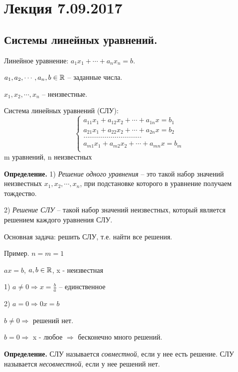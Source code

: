 \section{Лекция 7.09.2017}
\subsection{Системы линейных уравнений.}

Линейное уравнение: $a_1 x_1 + \cdots + a_n x_n = b$.

$a_1, a_2, \cdots, a_n, b \in \mathbb{R}$ -- заданные числа.

$x_1, x_2, \cdots, x_n$ -- неизвестные.

\bigskip
Система линейных уравнений (СЛУ):
\begin{equation*}
	\left\{
		\begin{aligned}
        a_{11}x_1 + a_{12}x_2 + \cdots + a_{1n}x = b_1 \\
        a_{21}x_1 + a_{22}x_2 + \cdots + a_{2n}x = b_2 \\
        \hdots \hdots \hdots \hdots \hdots \hdots \hdots \hdots \hdots \hdots\\
        a_{m1}x_1 + a_{m2}x_2 + \cdots + a_{mn}x = b_m \\
		\end{aligned}
	\right.
\end{equation*}
m уравнений, n неизвестных

\bigskip
\textbf{Определение.} 1) \textit{Решение одного уравнения} -- это такой набор значений неизвестных $x_1, x_2, \cdots, x_n$, при подстановке которого в уравнение получаем тождество.

2) \textit{Решение СЛУ} -- такой набор значений неизвестных, который является решением каждого уравнения СЛУ.

\bigskip
Основная задача: решить СЛУ, т.е. найти все решения.

\bigskip
Пример. $n = m = 1$

$ax = b$, $a, b \in \mathbb{R}$, x - неизвестная

1) $a \neq 0 \Rightarrow x = \frac{b}{a}$ -- единственное

2) $a = 0 \Rightarrow 0x = b$

$b \neq 0 \Rightarrow$ решений нет.

$b = 0 \Rightarrow$ x - любое $\Rightarrow$ бесконечно много решений.

\bigskip
\textbf{Определение.} СЛУ называется \textit{совместной}, если у нее есть решение. СЛУ называется \textit{несовместной}, если у нее решений нет.


